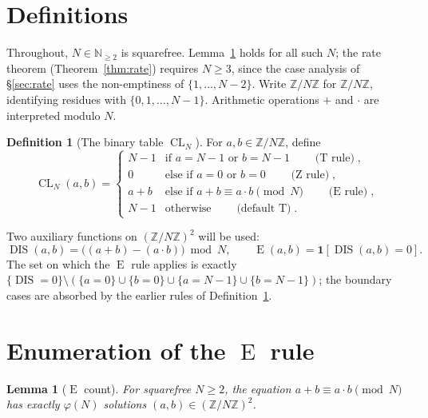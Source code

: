 \documentclass[11pt,reqno]{amsart}
\theoremstyle{plain}
\newtheorem{lemma}[theorem]{Lemma}
\theoremstyle{definition}
\newtheorem{definition}[theorem]{Definition}
\theoremstyle{remark}
\DeclareMathOperator{\DIS}{DIS}
\DeclareMathOperator{\CL}{CL}
\DeclareMathOperator{\ECHO}{E}
\DeclareMathOperator{\HARM}{T}
\DeclareMathOperator{\VOID}{Z}
\newcommand{\ZN}{\mathbb{Z}/N\mathbb{Z}}
\newcommand{\Z}{\mathbb{Z}}
\newcommand{\N}{\mathbb{N}}
\begin{document}
\section{Definitions}\label{sec:def}

Throughout, $N\in\N_{\ge 2}$ is squarefree. Lemma~\ref{lem:echo}
holds for all such $N$; the rate theorem (Theorem~\ref{thm:rate})
requires $N\ge 3$, since the case analysis of \S\ref{sec:rate} uses
the non-emptiness of $\{1,\dots,N-2\}$. Write $\ZN$ for
$\Z/N\Z$, identifying residues with $\{0,1,\dots,N-1\}$. Arithmetic
operations $+$ and $\cdot$ are interpreted modulo $N$.

\begin{definition}[The binary table $\CL_N$]\label{def:cl}
For $a,b\in\ZN$, define
\begin{equation}\label{eq:cl-def}
  \CL_N(a,b)=
  \begin{cases}
     N-1 & \text{if } a=N-1 \text{ or } b=N-1
           \qquad\text{($\HARM$ rule)},\\[1pt]
     0   & \text{else if } a=0 \text{ or } b=0
           \qquad\text{($\VOID$ rule)},\\[1pt]
     a+b & \text{else if } a+b\equiv a\cdot b\pmod N
           \qquad\text{($\ECHO$ rule)},\\[1pt]
     N-1 & \text{otherwise}
           \qquad\text{(default $\HARM$)}.
  \end{cases}
\end{equation}
\end{definition}

Two auxiliary functions on $(\ZN)^{2}$ will be used:
\begin{equation}\label{eq:dis-def}
  \DIS(a,b)=\bigl((a+b)-(a\cdot b)\bigr)\bmod N,
  \qquad
  \ECHO(a,b)=\mathbf{1}\!\left[\DIS(a,b)=0\right].
\end{equation}
The set on which the $\ECHO$ rule applies is exactly
$\{\DIS=0\}\setminus(\{a=0\}\cup\{b=0\}\cup\{a=N-1\}\cup\{b=N-1\})$;
the boundary cases are absorbed by the earlier rules of
Definition~\ref{def:cl}.

\section{Enumeration of the $\ECHO$ rule}\label{sec:enum}

\begin{lemma}[$\ECHO$ count]\label{lem:echo}
For squarefree $N\ge 2$, the equation $a+b\equiv a\cdot b\pmod N$ has
\emph{exactly} $\varphi(N)$ solutions $(a,b)\in(\ZN)^{2}$.
\end{lemma}
\end{document}
